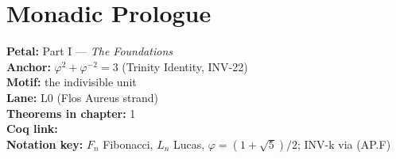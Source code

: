 %
%
%
%

\chapter{Monadic Prologue}


\begin{tcolorbox}[colback=yellow!4,colframe=yellow!50!brown,title={\textbf{Flos Aureus} \textbf{FA.00 Monad}}]
  \textbf{Petal:} Part I --- \emph{The Foundations} \\
  \textbf{Anchor:} \(\varphi^{2} + \varphi^{-2} = 3\) (Trinity Identity, INV-22) \\
  \textbf{Motif:} the indivisible unit \\
  \textbf{Lane:} L0 (Flos Aureus strand) \\
  \textbf{Theorems in chapter:} 1 \\
  \textbf{Coq link:}  \\
  \textbf{Notation key:} \(F_n\) Fibonacci, \(L_n\) Lucas, \(\varphi=(1+\sqrt{5})/2\); INV-k via  (AP.F)
\end{tcolorbox}

